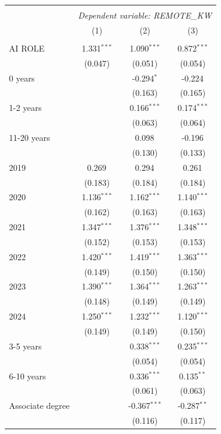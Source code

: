 \begin{table}[!htbp] \centering
\begin{tabular}{@{\extracolsep{5pt}}lccc}
\\[-1.8ex]\hline
\hline \\[-1.8ex]
& \multicolumn{3}{c}{\textit{Dependent variable: REMOTE_KW}} \
\cr \cline{2-4}
\\[-1.8ex] & (1) & (2) & (3) \\
\hline \\[-1.8ex]
 AI ROLE & 1.331$^{***}$ & 1.090$^{***}$ & 0.872$^{***}$ \\
& (0.047) & (0.051) & (0.054) \\
 0 years & & -0.294$^{*}$ & -0.224$^{}$ \\
& & (0.163) & (0.165) \\
 1-2 years & & 0.166$^{***}$ & 0.174$^{***}$ \\
& & (0.063) & (0.064) \\
 11-20 years & & 0.098$^{}$ & -0.196$^{}$ \\
& & (0.130) & (0.133) \\
 2019 & 0.269$^{}$ & 0.294$^{}$ & 0.261$^{}$ \\
& (0.183) & (0.184) & (0.184) \\
 2020 & 1.136$^{***}$ & 1.162$^{***}$ & 1.140$^{***}$ \\
& (0.162) & (0.163) & (0.163) \\
 2021 & 1.347$^{***}$ & 1.376$^{***}$ & 1.348$^{***}$ \\
& (0.152) & (0.153) & (0.153) \\
 2022 & 1.420$^{***}$ & 1.419$^{***}$ & 1.363$^{***}$ \\
& (0.149) & (0.150) & (0.150) \\
 2023 & 1.390$^{***}$ & 1.364$^{***}$ & 1.263$^{***}$ \\
& (0.148) & (0.149) & (0.149) \\
 2024 & 1.250$^{***}$ & 1.232$^{***}$ & 1.120$^{***}$ \\
& (0.149) & (0.149) & (0.150) \\
 3-5 years & & 0.338$^{***}$ & 0.235$^{***}$ \\
& & (0.054) & (0.054) \\
 6-10 years & & 0.336$^{***}$ & 0.135$^{**}$ \\
& & (0.061) & (0.063) \\
 Associate degree & & -0.367$^{***}$ & -0.287$^{**}$ \\
& & (0.116) & (0.117) \\

\end{tabular}
\end{table}
